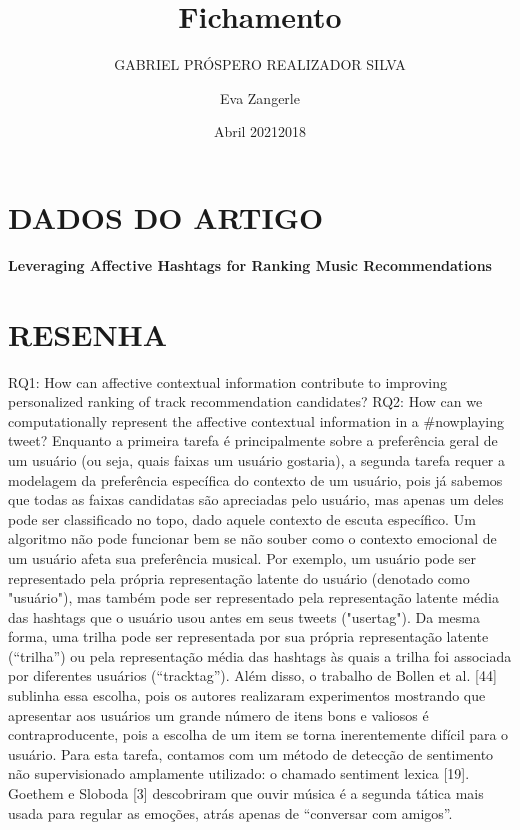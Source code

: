 \documentclass{article}
\title{Fichamento}
\author{GABRIEL PRÓSPERO REALIZADOR  SILVA}
\date{Abril 2021}
\begin{document}
\maketitle

\section{DADOS DO ARTIGO}
\textbf{Leveraging Affective Hashtags for Ranking Music Recommendations \\}
\author{Eva Zangerle \\}
\date{2018}

\section{RESENHA}
RQ1: How can affective contextual information contribute to improving personalized ranking of track recommendation candidates?
RQ2: How can we computationally represent the affective contextual information in a #nowplaying tweet? 
Enquanto a primeira tarefa é principalmente sobre a preferência geral de um usuário (ou seja, quais faixas um usuário gostaria), a segunda tarefa requer a modelagem da preferência específica do contexto de um usuário, pois já sabemos que todas as faixas candidatas são apreciadas pelo usuário, mas apenas um deles pode ser classificado no topo, dado aquele contexto de escuta específico. 
Um algoritmo não pode funcionar bem se não souber como o contexto emocional de um usuário afeta sua preferência musical.
Por exemplo, um usuário pode ser representado pela própria representação latente do usuário (denotado como "usuário"), mas também pode ser representado pela representação latente média das hashtags que o usuário usou antes em seus tweets ("usertag"). 
Da mesma forma, uma trilha pode ser representada por sua própria representação latente (“trilha”) ou pela representação média das hashtags às quais a trilha foi associada por diferentes usuários (“tracktag”).
Além disso, o trabalho de Bollen et al. [44] sublinha essa escolha, pois os autores realizaram experimentos mostrando que apresentar aos usuários um grande número de itens bons e valiosos é contraproducente, pois a escolha de um item se torna inerentemente difícil para o usuário.
Para esta tarefa, contamos com um método de detecção de sentimento não supervisionado amplamente utilizado: o chamado sentiment lexica [19].
Goethem e Sloboda [3] descobriram que ouvir música é a segunda tática mais usada para regular as emoções, atrás apenas de “conversar com amigos”.
\end{document}
